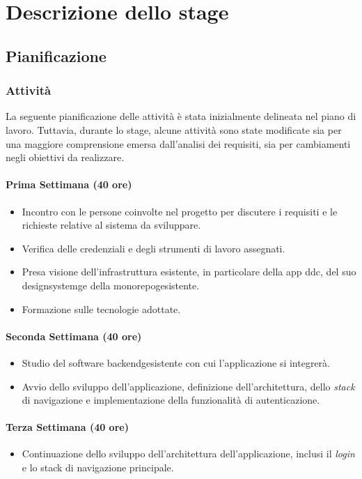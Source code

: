 \chapter{Descrizione dello stage}
\label{chap:stage_descrizione}

\section{Pianificazione}
\subsection{Attività}
La seguente pianificazione delle attività è stata inizialmente delineata nel piano di lavoro. 
Tuttavia, durante lo stage, alcune attività sono state modificate sia per una maggiore comprensione emersa dall'analisi dei requisiti, sia per cambiamenti negli obiettivi da realizzare.
\subsubsection*{Prima Settimana (40 ore)}
\begin{itemize}
    \item Incontro con le persone coinvolte nel progetto per discutere i requisiti e le richieste relative al sistema da sviluppare.
    \item Verifica delle credenziali e degli strumenti di lavoro assegnati.
    \item Presa visione dell'infrastruttura esistente, in particolare della app \gls{ddc}\glox, del suo \gls{designsystemg}\glox e della \gls{monorepog}\glox esistente.
    \item Formazione sulle tecnologie adottate.
\end{itemize}

\subsubsection*{Seconda Settimana (40 ore)}
\begin{itemize}
    \item Studio del software \gls{backendg}\glox esistente con cui l'applicazione si integrerà.
    \item Avvio dello sviluppo dell'applicazione, definizione dell'architettura, dello \textit{stack} di navigazione e implementazione della funzionalità di autenticazione.
\end{itemize}

\subsubsection*{Terza Settimana (40 ore)}
\begin{itemize}
    \item Continuazione dello sviluppo dell'architettura dell'applicazione, inclusi il \textit{login} e lo stack di navigazione principale.
\end{itemize}

